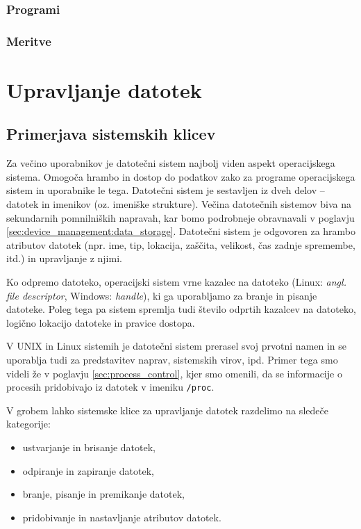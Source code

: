 \documentclass[a4paper,12pt,openright]{book}
\begin{document}
\subsection{Programi}

\subsection{Meritve}

\chapter{Upravljanje datotek}

\section{Primerjava sistemskih klicev}

Za večino uporabnikov je datotečni sistem najbolj viden aspekt operacijskega sistema.
Omogoča hrambo in dostop do podatkov zako za programe operacijskega sistem in uporabnike le tega.
Datotečni sistem je sestavljen iz dveh delov -- datotek in imenikov (oz. imeniške strukture).
Večina datotečnih sistemov biva na sekundarnih pomnilniških napravah, kar bomo podrobneje obravnavali v poglavju \ref{sec:device_management:data_storage}.
Datotečni sistem je odgovoren za hrambo atributov datotek (npr. ime, tip, lokacija, zaščita, velikost, čas zadnje spremembe, itd.) in upravljanje z njimi.

Ko odpremo datoteko, operacijski sistem vrne kazalec na datoteko (Linux: \textit{angl. file descriptor}, Windows: \textit{handle}), ki ga uporabljamo za branje in pisanje datoteke.
Poleg tega pa sistem spremlja tudi število odprtih kazalcev na datoteko, logično lokacijo datoteke in pravice dostopa.
\cite{Silberschatz_Galvin_Gagne_2018}

V UNIX in Linux sistemih je datotečni sistem prerasel svoj prvotni namen in se uporablja tudi za predstavitev naprav, sistemskih virov, ipd.
Primer tega smo videli že v poglavju \ref{sec:process_control}, kjer smo omenili, da se informacije o procesih pridobivajo iz datotek v imeniku \verb|/proc|.


V grobem lahko sistemske klice za upravljanje datotek razdelimo na sledeče kategorije:
\begin{itemize}
	\item ustvarjanje in brisanje datotek,
	\item odpiranje in zapiranje datotek,
	\item branje, pisanje in premikanje datotek,
	\item pridobivanje in nastavljanje atributov datotek.\cite{Silberschatz_Galvin_Gagne_2018}
\end{itemize}
\end{document}
